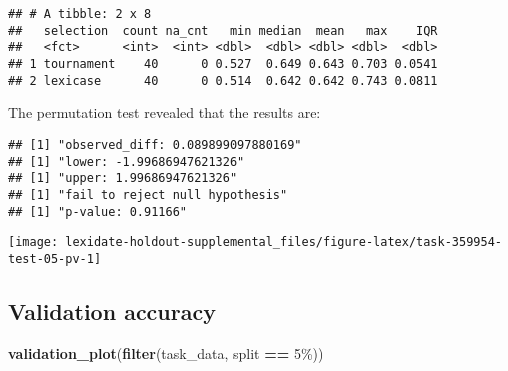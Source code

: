 \documentclass[
]{book}
\newenvironment{Shaded}{\begin{snugshade}}{\end{snugshade}}
\newcommand{\AttributeTok}[1]{\textcolor[rgb]{0.13,0.29,0.53}{#1}}
\newcommand{\DecValTok}[1]{\textcolor[rgb]{0.00,0.00,0.81}{#1}}
\newcommand{\FunctionTok}[1]{\textcolor[rgb]{0.13,0.29,0.53}{\textbf{#1}}}
\newcommand{\NormalTok}[1]{#1}
\newcommand{\OtherTok}[1]{\textcolor[rgb]{0.56,0.35,0.01}{#1}}
\newcommand{\SpecialCharTok}[1]{\textcolor[rgb]{0.81,0.36,0.00}{\textbf{#1}}}
\newcommand{\StringTok}[1]{\textcolor[rgb]{0.31,0.60,0.02}{#1}}
\begin{document}
\begin{verbatim}
## # A tibble: 2 x 8
##   selection  count na_cnt   min median  mean   max    IQR
##   <fct>      <int>  <int> <dbl>  <dbl> <dbl> <dbl>  <dbl>
## 1 tournament    40      0 0.527  0.649 0.643 0.703 0.0541
## 2 lexicase      40      0 0.514  0.642 0.642 0.743 0.0811
\end{verbatim}

The permutation test revealed that the results are:

\begin{Shaded}
\end{Shaded}

\begin{verbatim}
## [1] "observed_diff: 0.089899097880169"
## [1] "lower: -1.99686947621326"
## [1] "upper: 1.99686947621326"
## [1] "fail to reject null hypothesis"
## [1] "p-value: 0.91166"
\end{verbatim}

\texttt{[image: lexidate-holdout-supplemental\_files/figure-latex/task-359954-test-05-pv-1]}

\hypertarget{validation-accuracy-5}{%
\subsection{Validation accuracy}\label{validation-accuracy-5}}

\begin{Shaded}
\begin{Highlighting}[]
\FunctionTok{validation\_plot}\NormalTok{(}\FunctionTok{filter}\NormalTok{(task\_data, split }\SpecialCharTok{==} \StringTok{\textquotesingle{}5\%\textquotesingle{}}\NormalTok{))}
\end{Highlighting}
\end{Shaded}
\end{document}
